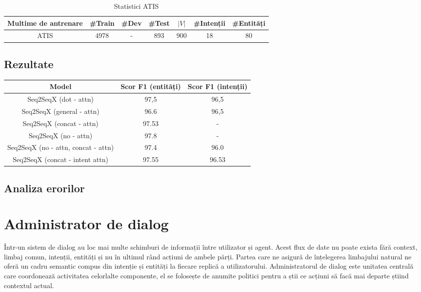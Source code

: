 \begin{table}
	\centering
	\caption{Statistici ATIS}
	\label{atis_stats}
	\begin{adjustbox}{max width=\textwidth}
		\begin{tabular}{ |c|c|c|c|c|c|c| } 
			\hline
			\textbf{Multime de antrenare} & \#Train & \#Dev & \#Test & $|V|$ & \#Intenții & \#Entități \\ 
			\hline
			ATIS & 4978 & - & 893 & 900 & 18 & 80 \\
			\hline
		\end{tabular}
	\end{adjustbox}
\end{table}




\subsection{Rezultate}
\begin{center}
	\begin{tabular}{ c c c } 
		\hline
		\textbf{Model} 		 & \textbf{Scor F1 (entități)} & \textbf{Scor F1 (intenții)}\\
		\hline
		Seq2SeqX (dot - attn) & 97,5 & 96,5 \\
		\hline
		Seq2SeqX (general - attn) & 96.6 & 96,5 \\
		\hline
		Seq2SeqX (concat - attn) & 97.53 & - \\
		\hline
		Seq2SeqX (no - attn) & 97.8 & - \\
		\hline
		Seq2SeqX (no - attn, concat - attn) & 97.4 & 96.0 \\
		\hline
		Seq2SeqX (concat - intent attn) & 97.55 & 96.53 \\
		\hline
	\end{tabular}
\end{center}

\subsection{Analiza erorilor}


\section{Administrator de dialog}

Într-un sistem de dialog au loc mai multe schimburi de informații între utilizator și agent. Acest flux de date nu poate exista fără context, limbaj comun, intenții, entități și nu în ultimul rând acțiuni de ambele părți. Partea care ne asigură de înțelegerea limbajului natural ne oferă un cadru semantic compus din intenție și entități la fiecare replică a utilizatorului. Administratorul de dialog este unitatea centrală care coordonează activitatea celorlalte componente, el se folosește de anumite politici pentru a știi ce acțiuni să facă mai departe știind contextul actual.

